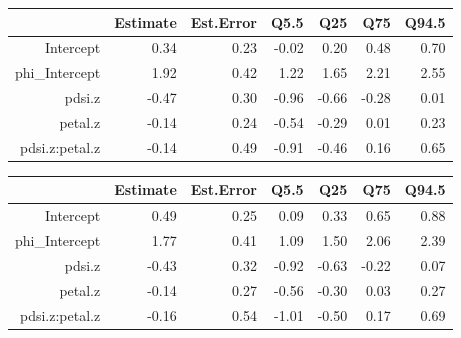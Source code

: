 \documentclass{article}[11pt]
\begin{document}
\begin{table}[ht]
\centering
\begin{tabular}{rrrrrrr}
  \hline
 & Estimate & Est.Error & Q5.5 & Q25 & Q75 & Q94.5 \\ 
  \hline
Intercept & 0.34 & 0.23 & -0.02 & 0.20 & 0.48 & 0.70 \\ 
  phi\_Intercept & 1.92 & 0.42 & 1.22 & 1.65 & 2.21 & 2.55 \\ 
  pdsi.z & -0.47 & 0.30 & -0.96 & -0.66 & -0.28 & 0.01 \\ 
  petal.z & -0.14 & 0.24 & -0.54 & -0.29 & 0.01 & 0.23 \\ 
  pdsi.z:petal.z & -0.14 & 0.49 & -0.91 & -0.46 & 0.16 & 0.65 \\ 
   \hline
\end{tabular}
\label{tab:nodoy}
\end{table}
\begin{table}[ht]
\centering
\begin{tabular}{rrrrrrr}
  \hline
 & Estimate & Est.Error & Q5.5 & Q25 & Q75 & Q94.5 \\ 
  \hline
Intercept & 0.49 & 0.25 & 0.09 & 0.33 & 0.65 & 0.88 \\ 
  phi\_Intercept & 1.77 & 0.41 & 1.09 & 1.50 & 2.06 & 2.39 \\ 
  pdsi.z & -0.43 & 0.32 & -0.92 & -0.63 & -0.22 & 0.07 \\ 
  petal.z & -0.14 & 0.27 & -0.56 & -0.30 & 0.03 & 0.27 \\ 
  pdsi.z:petal.z & -0.16 & 0.54 & -1.01 & -0.50 & 0.17 & 0.69 \\ 
   \hline
\end{tabular}
\end{table}
\pagebreak
\end{document}
